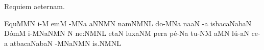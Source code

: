 
\beginhymn Requiem aeternam.

\nosolesmescustos
{}\Internote
{}
\initiumgregorianum
{}%
\sgn {}E{qu}\punctum M\spatiumparvum\pes MN\egn
\sgn {}i-\punctum M\egn
\sgn {}em\punctum M\egn
\spatium
\asteriscus
\spatium
\sgn {}{\ae}-\punctum M\nonspatium\pes Na\egn
{}\clivis aN\spatiumparvum\porrectus NMN\egn
\sgn nam\clivis NM\augmentumduplex NL\egn
\spatium
\divisiominor
\spatium
\sgn d{o}-\punctum M\nonspatium\pes Na\egn
\sgn na{}\clivis aN\egn
\spatium
{}-\punctum a\egn
\spatium
\sgn {}is\bmolle b\pessubbipunctis acaN\quilisma a\nonspatium\climacus baN\egn
\spatium
\sgn D{\'o}m\punctum M\egn
\sgn {}i-\scandicussubbipunctis MNaNM\punctum N\egn
\custos N
\lineaproxima
\sgn ne:\clivis NM\augmentumduplex NL\egn
\spatium
\divisiomaior
\spatium
\sgn {}et\cephalicus aN\egn
\spatium
\sgn lux\climacus aNM\egn
\spatium
\sgn per\punctum a\egn
\sgn p{\'e}-\pes Na\egn
\sgn tu-\clivis NM\egn
\sgn {}a{}\punctum M\augmentum N\egn
\spatium
\divisiominor
\spatium
\sgn l{\'u}-\clivis aN\egn
\sgn ce-\punctum a\egn
\spatium
\sgn {}at\bmolle b\pessubbipunctis acaN\quilisma a\nonspatium\climacus baN\egn
\spatium
{}-\scandicussubbipunctis MNaNM\nonspatium\punctum N\egn
\spatium
\sgn {}i{s.}\clivis NM\augmentumduplex NL\egn
\spatium
\Finisgregoriana

\bigskip




